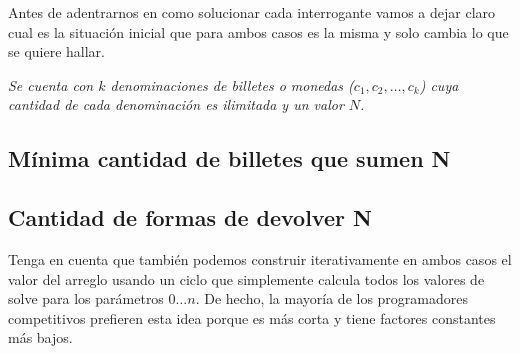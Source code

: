 Antes de adentrarnos en como solucionar cada interrogante vamos a dejar claro cual es la situación inicial que para ambos casos es la misma y solo cambia lo que se quiere hallar.

\emph{Se cuenta con $k$ denominaciones de billetes o monedas ($c_1,c_2,\dots,c_k$) cuya cantidad de cada denominación es ilimitada y un valor $N$.}

\subsection{Mínima cantidad de billetes que sumen N}


\subsection{Cantidad de formas de devolver N}


Tenga en cuenta que también podemos construir iterativamente en ambos casos el valor del arreglo  usando un ciclo que simplemente calcula todos los valores de solve para los parámetros $0\dots n$. De hecho, la mayoría de los programadores competitivos prefieren esta idea porque es más corta y tiene factores constantes más bajos.

